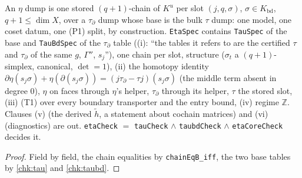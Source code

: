\begin{definition}\label{chk:eta}
  \leanok
  An $\eta$ dump is one stored $(q{+}1)$-chain of $K^u$ per slot $(j,q,\sigma)$, $\sigma\in K_{\mathrm{bd}}$, $q+1\le\dim X$, over a
  $\tau_\partial$ dump whose base is the bulk $\tau$ dump: one model, one coset datum, one (P1) split, by construction.
  \texttt{EtaSpec} contains \texttt{TauSpec} of the base and \texttt{TauBdSpec} of the $\tau_\partial$ table ((i): ``the tables it
  refers to are the certified $\tau$ and $\tau_\partial$ of the same $g$, $\Gamma''$, $s_j$''), one chain per slot, structure
  ($\sigma_t$ a $(q{+}1)$-simplex, canonical, $\det=1$), (ii) the homotopy identity
  $\partial\eta(s_j\sigma)+\eta(\partial(s_j\sigma))=(j\tau_\partial-\tau j)(s_j\sigma)$ (the middle term absent in degree $0$), $\eta$
  on faces through $\eta$'s helper, $\tau_\partial$ through its helper, $\tau$ the stored slot, (iii) (T1) over every boundary
  transporter and the entry bound, (iv) regime $\mathbb{Z}$. Clauses (v) (the derived $\tilde h$, a statement about cochain matrices)
  and (vi) (diagnostics) are out. \texttt{etaCheck} $=$ \texttt{tauCheck} $\wedge$ \texttt{taubdCheck} $\wedge$
  \texttt{etaCoreCheck} decides it.
\end{definition}
\begin{proof}
  \leanok
  Field by field, the chain equalities by \texttt{chainEqB\_iff}, the two base tables by \ref{chk:tau} and \ref{chk:taubd}.
\end{proof}

